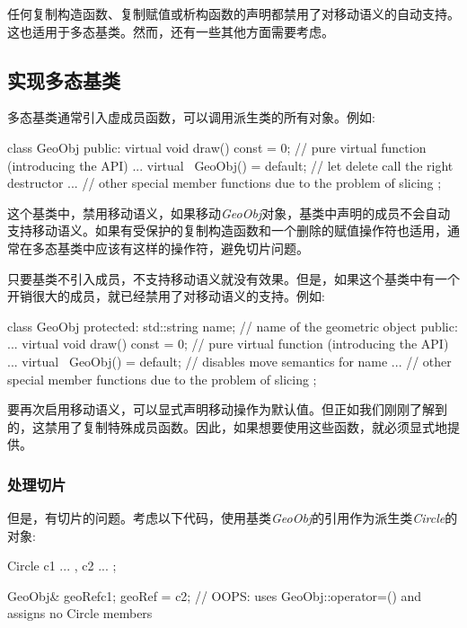 任何复制构造函数、复制赋值或析构函数的声明都禁用了对移动语义的自动支持。这也适用于多态基类。然而，还有一些其他方面需要考虑。

\subsection{实现多态基类}

多态基类通常引入虚成员函数，可以调用派生类的所有对象。例如:

\begin{cppcode}
class GeoObj {
	public:
	virtual void draw() const = 0; // pure virtual function (introducing the API)
	...
	virtual ~GeoObj() = default; // let delete call the right destructor
	... // other special member functions due to the problem of slicing
};
\end{cppcode}

这个基类中，禁用移动语义，如果移动\textit{GeoObj}对象，基类中声明的成员不会自动支持移动语义。如果有受保护的复制构造函数和一个删除的赋值操作符也适用，通常在多态基类中应该有这样的操作符，避免切片问题。

只要基类不引入成员，不支持移动语义就没有效果。但是，如果这个基类中有一个开销很大的成员，就已经禁用了对移动语义的支持。例如:

\begin{cppcode}
class GeoObj {
protected:
	std::string name; // name of the geometric object
public:
	...
	virtual void draw() const = 0; // pure virtual function (introducing the API)
	...
	virtual ~GeoObj() = default; // disables move semantics for name
	... // other special member functions due to the problem of slicing
};
\end{cppcode}

要再次启用移动语义，可以显式声明移动操作为默认值。但正如我们刚刚了解到的，这禁用了复制特殊成员函数。因此，如果想要使用这些函数，就必须显式地提供。

\subsubsection{处理切片}

但是，有切片的问题。考虑以下代码，使用基类\textit{GeoObj}的引用作为派生类\textit{Circle}的对象:

\begin{cppcode}
Circle c1{ ... }, c2{ ... };

GeoObj& geoRef{c1};
geoRef = c2; // OOPS: uses GeoObj::operator=() and assigns no Circle members
\end{cppcode}

